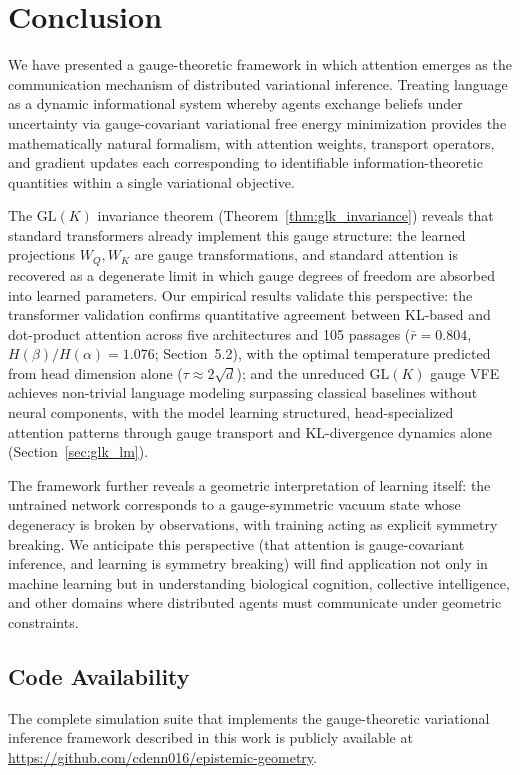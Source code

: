 \documentclass[twoside,11pt]{article}
\begin{document}
\section{Conclusion}

We have presented a gauge-theoretic framework in which attention emerges as the communication mechanism of distributed variational inference. Treating language as a dynamic informational system whereby agents exchange beliefs under uncertainty via gauge-covariant variational free energy minimization provides the mathematically natural formalism, with attention weights, transport operators, and gradient updates each corresponding to identifiable information-theoretic quantities within a single variational objective.

The $\mathrm{GL}(K)$ invariance theorem (Theorem~\ref{thm:glk_invariance}) reveals that standard transformers already implement this gauge structure: the learned projections $W_Q, W_K$ are gauge transformations, and standard attention is recovered as a degenerate limit in which gauge degrees of freedom are absorbed into learned parameters. Our empirical results validate this perspective: the transformer validation confirms quantitative agreement between KL-based and dot-product attention across five architectures and 105 passages ($\bar{r} = 0.804$, $H(\beta)/H(\alpha) = 1.076$; Section~5.2), with the optimal temperature predicted from head dimension alone ($\tau \approx 2\sqrt{d}$); and the unreduced $\mathrm{GL}(K)$ gauge VFE achieves non-trivial language modeling surpassing classical baselines without neural components, with the model learning structured, head-specialized attention patterns through gauge transport and KL-divergence dynamics alone (Section~\ref{sec:glk_lm}).

The framework further reveals a geometric interpretation of learning itself: the untrained network corresponds to a gauge-symmetric vacuum state whose degeneracy is broken by observations, with training acting as explicit symmetry breaking. We anticipate this perspective (that attention is gauge-covariant inference, and learning is symmetry breaking) will find application not only in machine learning but in understanding biological cognition, collective intelligence, and other domains where distributed agents must communicate under geometric constraints.


\subsection{Code Availability}
The complete simulation suite that implements the gauge-theoretic variational inference framework described in this work is publicly available at \href{https://github.com/cdenn016/epistemic-geometry}{https://github.com/cdenn016/epistemic-geometry}.
\end{document}
